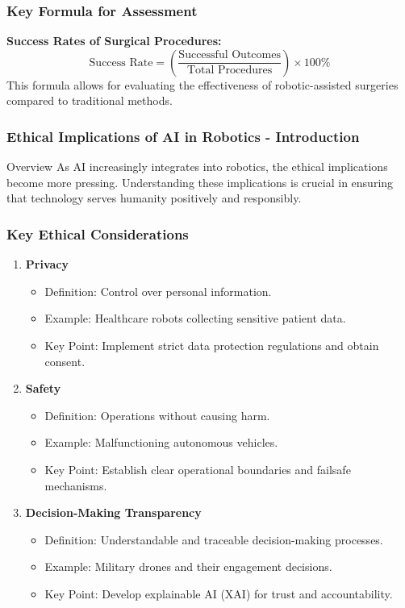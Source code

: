 \documentclass[aspectratio=169]{beamer}
\begin{document}
\begin{frame}[fragile]
    \frametitle{Key Formula for Assessment}
    
    \textbf{Success Rates of Surgical Procedures:}
    \begin{equation}
        \text{Success Rate} = \left( \frac{\text{Successful Outcomes}}{\text{Total Procedures}} \right) \times 100\%
    \end{equation}
    This formula allows for evaluating the effectiveness of robotic-assisted surgeries compared to traditional methods.
\end{frame}

\begin{frame}[fragile]
    \frametitle{Ethical Implications of AI in Robotics - Introduction}
    \begin{block}{Overview}
        As AI increasingly integrates into robotics, the ethical implications become more pressing. 
        Understanding these implications is crucial in ensuring that technology serves humanity positively and responsibly.
    \end{block}
\end{frame}

\begin{frame}[fragile]
    \frametitle{Key Ethical Considerations}
    \begin{enumerate}
        \item \textbf{Privacy}
            \begin{itemize}
                \item Definition: Control over personal information.
                \item Example: Healthcare robots collecting sensitive patient data.
                \item Key Point: Implement strict data protection regulations and obtain consent.
            \end{itemize}
        \item \textbf{Safety}
            \begin{itemize}
                \item Definition: Operations without causing harm.
                \item Example: Malfunctioning autonomous vehicles.
                \item Key Point: Establish clear operational boundaries and failsafe mechanisms.
            \end{itemize}
        \item \textbf{Decision-Making Transparency}
            \begin{itemize}
                \item Definition: Understandable and traceable decision-making processes.
                \item Example: Military drones and their engagement decisions.
                \item Key Point: Develop explainable AI (XAI) for trust and accountability.
            \end{itemize}
    \end{enumerate}
\end{frame}
\end{document}
